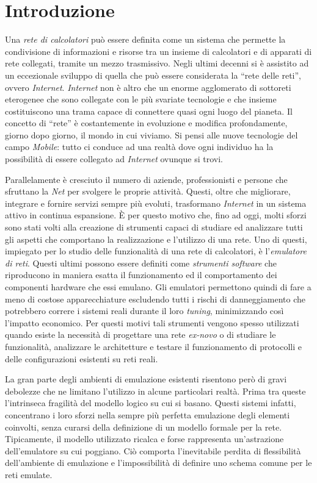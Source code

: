 \chapter*{Introduzione}

Una \emph{rete di calcolatori} può essere definita come un sistema che permette la condivisione di informazioni e risorse tra un insieme di calcolatori e di apparati di rete collegati, tramite un mezzo trasmissivo.
Negli ultimi decenni si è assistito ad un eccezionale sviluppo di quella che può essere considerata la ``rete delle reti'', ovvero \emph{Internet}.
\emph{Internet} non è altro che un enorme agglomerato di sottoreti eterogenee che sono collegate con le più svariate tecnologie e che insieme costituiscono una trama capace di connettere quasi ogni luogo del pianeta. Il concetto di ``rete'' è costantemente in evoluzione e modifica profondamente, giorno dopo giorno, il mondo in cui viviamo. Si pensi alle nuove tecnologie del campo \emph{Mobile}: tutto ci conduce ad una realtà dove ogni individuo ha la possibilità di essere collegato ad \emph{Internet} ovunque si trovi.

Parallelamente è cresciuto il numero di aziende, professionisti e persone che sfruttano la \emph{Net} per svolgere le proprie attività. Questi, oltre che migliorare, integrare e fornire servizi sempre più evoluti, trasformano \emph{Internet} in un sistema attivo in continua espansione.
È per questo motivo che, fino ad oggi, molti sforzi sono stati volti alla creazione di strumenti capaci di studiare ed analizzare tutti gli aspetti che comportano la realizzazione e l'utilizzo di una rete.
Uno di questi, impiegato per lo studio delle funzionalità di una rete di calcolatori, è l'\emph{emulatore di reti}. Questi ultimi possono essere definiti come \emph{strumenti software} che riproducono in maniera esatta il funzionamento ed il comportamento dei componenti hardware che essi emulano. Gli emulatori permettono quindi di fare a meno di costose apparecchiature escludendo tutti i rischi di danneggiamento che potrebbero correre i sistemi reali durante il loro \emph{tuning}, minimizzando così l'impatto economico.
Per questi motivi tali strumenti vengono spesso utilizzati quando esiste la necessità di progettare una rete \emph{ex-novo} o di studiare le funzionalità, analizzare le architetture e testare il funzionamento di protocolli e delle configurazioni esistenti su reti reali.

La gran parte degli ambienti di emulazione esistenti risentono però di gravi debolezze che ne limitano l'utilizzo in alcune particolari realtà. Prima tra queste l'intrinseca fragilità del modello logico su cui si basano.
Questi sistemi infatti, concentrano i loro sforzi nella sempre più perfetta emulazione degli elementi coinvolti, senza curarsi della definizione di un modello formale per la rete.
Tipicamente, il modello utilizzato ricalca e forse rappresenta un'astrazione dell'emulatore su cui poggiano. Ciò comporta l'inevitabile perdita di flessibilità dell'ambiente di emulazione e l'impossibilità di definire uno schema comune per le reti emulate.

